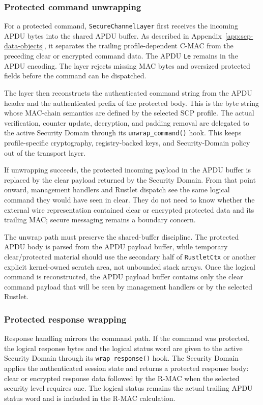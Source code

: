 \subsubsection{Protected command unwrapping}

For a protected command, \texttt{SecureChannelLayer} first receives the
incoming APDU bytes into the shared APDU buffer. As described in
Appendix~\ref{app:scp-data-objects}, it separates the trailing
profile-dependent C-MAC from the preceding clear or encrypted command data.
The APDU \texttt{Le} remains in the APDU encoding. The layer rejects missing
MAC bytes and oversized protected fields before the command can be dispatched.

The layer then reconstructs the authenticated command string from the APDU
header and the authenticated prefix of the protected body. This is the byte
string whose MAC-chain semantics are defined by the selected SCP profile. The
actual verification, counter update, decryption, and padding removal are
delegated to the active Security Domain through its
\texttt{unwrap\_command()} hook. This keeps profile-specific cryptography,
registry-backed keys, and Security-Domain policy out of the transport layer.

If unwrapping succeeds, the protected incoming payload in the APDU buffer is
replaced by the clear payload returned by the Security Domain. From that point
onward, management handlers and Rustlet dispatch see the same logical command
they would have seen in clear. They do not need to know whether the external
wire representation contained clear or encrypted protected data and its
trailing MAC; secure messaging remains a boundary concern.

The unwrap path must preserve the shared-buffer discipline. The protected APDU
body is parsed from the APDU payload buffer, while temporary clear/protected
material should use the secondary half of \texttt{RustletCtx} or another
explicit kernel-owned scratch area, not unbounded stack arrays. Once the
logical command is reconstructed, the APDU payload buffer contains only the
clear command payload that will be seen by management handlers or by the
selected Rustlet.

\subsubsection{Protected response wrapping}

Response handling mirrors the command path. If the command was protected, the
logical response bytes and the logical status word are given to the active
Security Domain through its \texttt{wrap\_response()} hook. The Security Domain
applies the authenticated session state and returns a protected response body:
clear or encrypted response data followed by the R-MAC when the selected
security level requires one. The logical status remains the actual trailing
APDU status word and is included in the R-MAC calculation.

